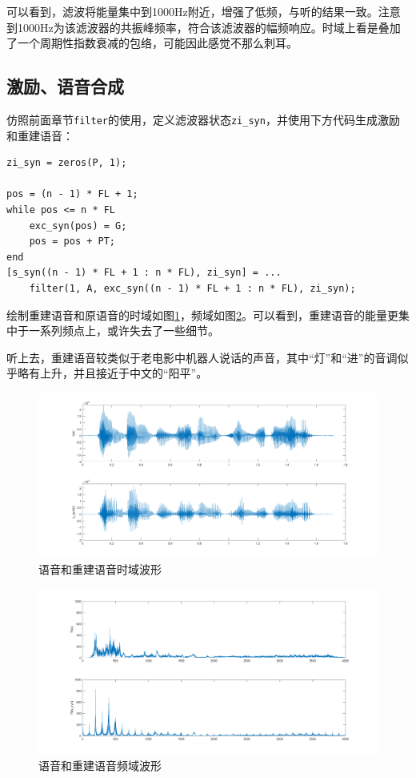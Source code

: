 \documentclass[10pt, a4paper]{article}
\begin{document}
可以看到，滤波将能量集中到1000Hz附近，增强了低频，与听的结果一致。注意到1000Hz为该滤波器的共振峰频率，符合该滤波器的幅频响应。时域上看是叠加了一个周期性指数衰减的包络，可能因此感觉不那么刺耳。

\subsection{激励、语音合成}\label{sec:syn}

仿照前面章节\texttt{filter}的使用，定义滤波器状态\texttt{zi_syn}，并使用下方代码生成激励和重建语音：

\begin{verbatim}
zi_syn = zeros(P, 1);

pos = (n - 1) * FL + 1;
while pos <= n * FL
    exc_syn(pos) = G;
    pos = pos + PT;
end
[s_syn((n - 1) * FL + 1 : n * FL), zi_syn] = ...
    filter(1, A, exc_syn((n - 1) * FL + 1 : n * FL), zi_syn);
\end{verbatim}

绘制重建语音和原语音的时域如图\ref{fig:2_4_time}，频域如图\ref{fig:2_4_freq}。可以看到，重建语音的能量更集中于一系列频点上，或许失去了一些细节。

听上去，重建语音较类似于老电影中机器人说话的声音，其中“灯”和“进”的音调似乎略有上升，并且接近于中文的“阳平”。

\begin{figure}[h]
    \centering
    \includegraphics[width=.8\textwidth]{../assets/2_4_time.png}
    \caption{语音和重建语音时域波形}
    \label{fig:2_4_time}
\end{figure}

\begin{figure}[h]
    \centering
    \includegraphics[width=.8\textwidth]{../assets/2_4_freq.png}
    \caption{语音和重建语音频域波形}
    \label{fig:2_4_freq}
\end{figure}
\end{document}
